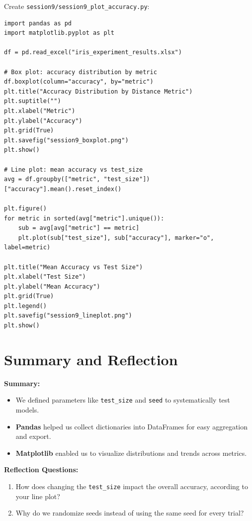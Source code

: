 \begin{tcolorbox}[title=Do: Visualization with Matplotlib]
Create \texttt{session9/session9\_plot\_accuracy.py}:
\begin{verbatim}
import pandas as pd
import matplotlib.pyplot as plt

df = pd.read_excel("iris_experiment_results.xlsx")

# Box plot: accuracy distribution by metric
df.boxplot(column="accuracy", by="metric")
plt.title("Accuracy Distribution by Distance Metric")
plt.suptitle("")
plt.xlabel("Metric")
plt.ylabel("Accuracy")
plt.grid(True)
plt.savefig("session9_boxplot.png")
plt.show()

# Line plot: mean accuracy vs test_size
avg = df.groupby(["metric", "test_size"])["accuracy"].mean().reset_index()

plt.figure()
for metric in sorted(avg["metric"].unique()):
    sub = avg[avg["metric"] == metric]
    plt.plot(sub["test_size"], sub["accuracy"], marker="o", label=metric)

plt.title("Mean Accuracy vs Test Size")
plt.xlabel("Test Size")
plt.ylabel("Mean Accuracy")
plt.grid(True)
plt.legend()
plt.savefig("session9_lineplot.png")
plt.show()
\end{verbatim}
\end{tcolorbox}

\section{Summary and Reflection}
\textbf{Summary:}
\begin{itemize}
    \item We defined parameters like \texttt{test\_size} and \texttt{seed} to systematically test models.
    \item \textbf{Pandas} helped us collect dictionaries into DataFrames for easy aggregation and export.
    \item \textbf{Matplotlib} enabled us to visualize distributions and trends across metrics.
\end{itemize}

\textbf{Reflection Questions:}
\begin{enumerate}
    \item How does changing the \texttt{test\_size} impact the overall accuracy, according to your line plot?
    \item Why do we randomize seeds instead of using the same seed for every trial?
\end{enumerate}

